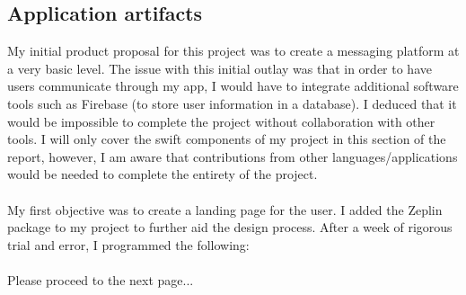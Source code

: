 \documentclass[a4paper, 11pt]{report}
\begin{document}
\subsection{Application artifacts}

My initial product proposal for this project was to create a messaging platform at a very basic level. The issue with this initial outlay was that in order to have users communicate through my app, I would have to integrate additional software tools such as Firebase (to store user information in a database). I deduced that it would be impossible to complete the project without collaboration with other tools. I will only cover the swift components of my project in this section of the report, however, I am aware that contributions from other languages/applications would be needed to complete the entirety of the project.\\
\\
My first objective was to create a landing page for the user. I added the Zeplin package to my project to further aid the design process. After a week of rigorous trial and error, I programmed the following:
\\
\\
Please proceed to the next page...
\end{document}
